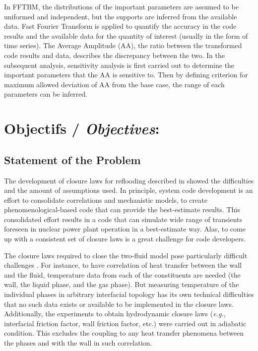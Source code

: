 \documentclass[11pt,titlepage]{article}
\begin{document}
In FFTBM, the distributions of the important parameters are assumed to be uniformed and independent, but the supports are inferred from the available data. 
Fast Fourier Transform is applied to quantify the accuracy in the code results and the available data for the quantity of interest (usually in the form of time series). 
The Average Amplitude (AA), the ratio between the transformed code results and data, describes the discrepancy between the two. 
In the subsequent analysis, sensitivity analysis is first carried out to determine the important parameters that the AA is sensitive to. 
Then by defining criterion for maximum allowed deviation of AA from the base case, the range of each parameters can be inferred.

\newpage
\section{Objectifs /  {\large\textit{Objectives}}:}

\subsection{Statement of the Problem}

The development of closure laws for reflooding described in \cite{Nelson1992} showed the difficulties and the amount of assumptions used. 
In principle, system code development is an effort to consolidate correlations and mechanistic models, to create phenomenological-based code that can provide the best-estimate results. 
This consolidated effort results in a code that can simulate wide range of transients foreseen in nuclear power plant operation in a best-estimate way. 
Alas, to come up with a consistent set of closure laws is a great challenge for code developers.

The closure laws required to close the two-fluid model pose particularly difficult challenges \cite{Wulff2007}. 
For instance, to have correlation of heat transfer between the wall and the fluid, temperature data from each of the constituents are needed (the wall, the liquid phase, and the gas phase). 
But measuring temperature of the individual phases in arbitrary interfacial topology has its own technical difficulties that no such data exists or available to be implemented in the closure laws.
Additionally, the experiments to obtain hydrodynamic closure laws (\textit{e.g.,} interfacial friction factor, wall friction factor, etc.) were carried out in adiabatic condition. 
This excludes the coupling to any heat transfer phenomena between the phases and with the wall in such correlation. 
\end{document}
